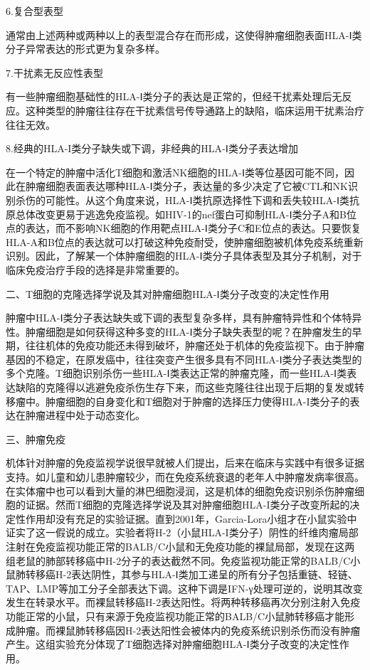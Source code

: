 6.复合型表型

通常由上述两种或两种以上的表型混合存在而形成，这使得肿瘤细胞表面HLA-Ⅰ类分子异常表达的形式更为复杂多样。

7.干扰素无反应性表型

有一些肿瘤细胞基础性的HLA-Ⅰ类分子的表达是正常的，但经干扰素处理后无反应。这种类型的肿瘤往往存在干扰素信号传导通路上的缺陷，临床运用干扰素治疗往往无效。

8.经典的HLA-I类分子缺失或下调，非经典的HLA-Ⅰ类分子表达增加

在一个特定的肿瘤中活化T细胞和激活NK细胞的HLA-Ⅰ类等位基因可能不同，因此在肿瘤细胞表面表达哪种HLA-Ⅰ类分子，表达量的多少决定了它被CTL和NK识别杀伤的可能性。从这个角度来说，HLA-Ⅰ类抗原选择性下调和丢失较HLA-Ⅰ类抗原总体改变更易于逃逸免疫监视。如HIV-1的nef蛋白可抑制HLA-Ⅰ类分子A和B位点的表达，而不影响NK细胞的作用靶点HLA-Ⅰ类分子C和E位点的表达。只要恢复HLA-A和B位点的表达就可以打破这种免疫耐受，使肿瘤细胞被机体免疫系统重新识别。因此，了解某一个体肿瘤细胞的HLA-Ⅰ类分子具体表型及其分子机制，对于临床免疫治疗手段的选择是非常重要的。

\begin{center}
    {\large 二、T细胞的克隆选择学说及其对肿瘤细胞HLA-Ⅰ类分子改变的决定性作用}
\end{center}

肿瘤中HLA-Ⅰ类分子表达缺失或下调的表型复杂多样，具有肿瘤特异性和个体特异性。肿瘤细胞是如何获得这种多变的HLA-Ⅰ类分子缺失表型的呢？在肿瘤发生的早期，往往机体的免疫功能还未得到破坏，肿瘤还处于机体的免疫监视下。由于肿瘤基因的不稳定，在原发癌中，往往突变产生很多具有不同HLA-Ⅰ类分子表达类型的多个克隆。T细胞识别杀伤一些HLA-Ⅰ类表达正常的肿瘤克隆，而一些HLA-Ⅰ类表达缺陷的克隆得以逃避免疫杀伤生存下来，而这些克隆往往出现于后期的复发或转移瘤中。肿瘤细胞的自身变化和T细胞对于肿瘤的选择压力使得HLA-I类分子的表达在肿瘤进程中处于动态变化。

\begin{center}
    {\large 三、肿瘤免疫}
\end{center}

机体针对肿瘤的免疫监视学说很早就被人们提出，后来在临床与实践中有很多证据支持。如儿童和幼儿患肿瘤较少，而在免疫系统衰退的老年人中肿瘤发病率很高。在实体瘤中也可以看到大量的淋巴细胞浸润，这是机体的细胞免疫识别杀伤肿瘤细胞的证据。然而T细胞的克隆选择学说及其对肿瘤细胞HLA-I类分子改变所起的决定性作用却没有充足的实验证据。直到2001年，Garcia-Lora小组才在小鼠实验中证实了这一假说的成立。实验者将H-2（小鼠HLA-I类分子）阴性的纤维肉瘤局部注射在免疫监视功能正常的BALB/C小鼠和无免疫功能的裸鼠局部，发现在这两组老鼠的肺部转移癌中H-2分子的表达截然不同。免疫监视功能正常的BALB/C小鼠肺转移癌H-2表达阴性，其参与HLA-Ⅰ类加工递呈的所有分子包括重链、轻链、TAP、LMP等加工分子全部表达下调。这种下调是IFN-γ处理可逆的，说明其改变发生在转录水平。而裸鼠转移癌H-2表达阳性。将两种转移癌再次分别注射入免疫功能正常的小鼠，只有来源于免疫监视功能正常的BALB/C小鼠肺转移癌才能形成肿瘤。而裸鼠肺转移癌因H-2表达阳性会被体内的免疫系统识别杀伤而没有肿瘤产生。这组实验充分体现了T细胞选择对肿瘤细胞HLA-Ⅰ类分子改变的决定性作用。

